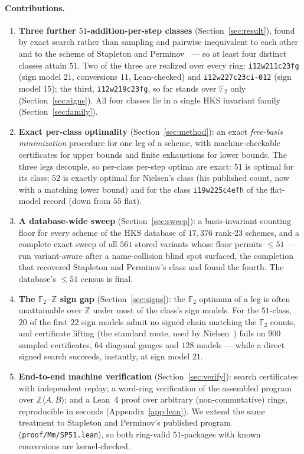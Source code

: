 \documentclass[11pt]{article}
\theoremstyle{definition}
\theoremstyle{remark}
\newcommand{\F}{\mathbb{F}}
\newcommand{\Z}{\mathbb{Z}}
\begin{document}
\paragraph{Contributions.}
\begin{enumerate}
\item \textbf{Three further $51$-addition-per-step classes}
  (Section~\ref{sec:result}), found by exact search rather than
  sampling and pairwise inequivalent to each other and to the scheme
  of Stapleton and Perminov~\cite{SP26} --- so at least four distinct
  classes attain $51$.  Two of the three are realized over every
  ring: \texttt{i12w211c23fg} (sign model $21$, conversions $11$,
  Lean-checked) and \texttt{i12w227c23ci-012} (sign model $15$); the
  third, \texttt{i12w219c23fg}, so far stands over $\F_2$ only
  (Section~\ref{sec:signs}).  All four classes lie in a single HKS
  invariant family (Section~\ref{sec:family}).
\item \textbf{Exact per-class optimality} (Section~\ref{sec:method}):
  an exact \emph{free-basis minimization} procedure for one leg of a
  scheme, with machine-checkable certificates for upper bounds and
  finite exhaustions for lower bounds.  The three legs decouple, so
  per-class per-step optima are exact: $51$ is optimal for its class;
  $52$ is exactly optimal for Nielsen's class (his published count,
  now with a matching lower bound) and for the class
  \texttt{i19w225c4efh} of the flat-model record (down from $55$
  flat).
\item \textbf{A database-wide sweep} (Section~\ref{sec:sweep}): a
  basis-invariant counting floor for every scheme of the HKS database
  of $17{,}376$ rank-23 schemes, and a complete exact sweep of all
  $561$ stored variants whose floor permits $\le 51$ --- run
  variant-aware after a name-collision blind spot surfaced, the
  completion that recovered Stapleton and Perminov's class and found
  the fourth.  The database's $\le51$ census is final.
\item \textbf{The $\F_2$--$\Z$ sign gap} (Section~\ref{sec:signs}): the
  $\F_2$ optimum of a leg is often unattainable over $\Z$ under most
  of the class's sign models.  For the $51$-class, $20$ of the first
  $22$ sign models admit no signed chain matching the $\F_2$ counts,
  and certificate lifting (the standard route, used by
  Nielsen~\cite{Nielsen26}) fails on $900$ sampled certificates,
  $64$ diagonal gauges and $128$ models --- while a direct signed
  search succeeds, instantly, at sign model $21$.
\item \textbf{End-to-end machine verification}
  (Section~\ref{sec:verify}): search certificates with independent
  replay; a word-ring verification of the assembled program over
  $\Z\langle A,B\rangle$; and a Lean~4 proof over arbitrary
  (non-commutative) rings, reproducible in seconds
  (Appendix~\ref{app:lean}).  We extend the same treatment to
  Stapleton and Perminov's published program
  (\texttt{proof/Mm/SP51.lean}), so both ring-valid $51$-packages
  with known conversions are kernel-checked.
\end{enumerate}
\end{document}
